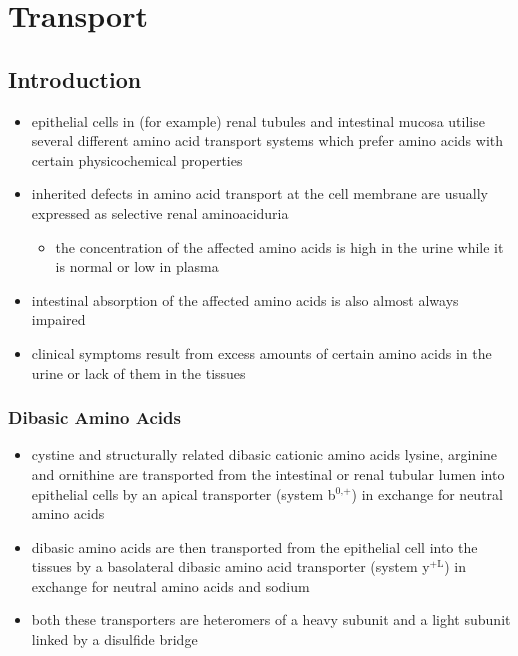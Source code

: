 \documentclass{scrartcl}
\begin{document}
\section{Transport}
\label{sec:orgceb2d0f}
\subsection{Introduction}
\label{sec:org4a481b2}
\begin{itemize}
\item epithelial cells in (for example) renal tubules and intestinal
mucosa utilise several different amino acid transport systems which
prefer amino acids with certain physicochemical properties
\item inherited defects in amino acid transport at the cell membrane are
usually expressed as selective renal aminoaciduria
\begin{itemize}
\item the concentration of the affected amino acids is high in the urine
while it is normal or low in plasma
\end{itemize}
\item intestinal absorption of the affected amino acids is also almost
always impaired
\item clinical symptoms result from excess amounts of certain amino acids
in the urine or lack of them in the tissues
\end{itemize}
\subsubsection{Dibasic Amino Acids}
\label{sec:orgfd263de}
\begin{itemize}
\item cystine and structurally related dibasic cationic amino acids
lysine, arginine and ornithine are transported from the intestinal
or renal tubular lumen into epithelial cells by an apical
transporter (system b\(^{\text{0,+}}\)) in exchange for neutral amino acids
\item dibasic amino acids are then transported from the epithelial cell
into the tissues by a basolateral dibasic amino acid transporter
(system y\(^{\text{+L}}\)) in exchange for neutral amino acids and sodium
\item both these transporters are heteromers of a heavy subunit and a
light subunit linked by a disulfide bridge
\end{itemize}
\end{document}
